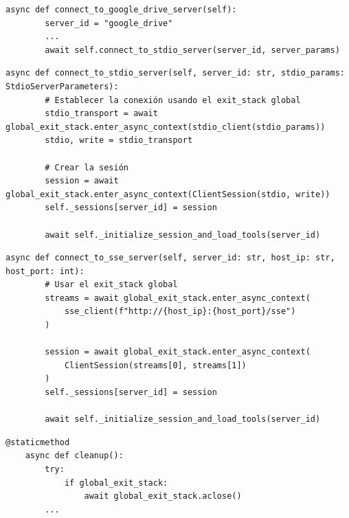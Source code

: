\begin{lstlisting}[caption={mcp\_multi\_client.py: función \textit{connect\_to\_google\_drive\_server en Cliente MCP}},label={lst:mcpconnect}]
    async def connect_to_google_drive_server(self):
        server_id = "google_drive"
        ...
        await self.connect_to_stdio_server(server_id, server_params)
\end{lstlisting}

\begin{lstlisting}[caption={mcp\_multi\_client.py: función \textit{connect\_to\_stdio\_server en cliente MCP}},label={lst:mcpstdio}]
    async def connect_to_stdio_server(self, server_id: str, stdio_params: StdioServerParameters):
        # Establecer la conexión usando el exit_stack global
        stdio_transport = await global_exit_stack.enter_async_context(stdio_client(stdio_params))
        stdio, write = stdio_transport

        # Crear la sesión
        session = await global_exit_stack.enter_async_context(ClientSession(stdio, write))
        self._sessions[server_id] = session

        await self._initialize_session_and_load_tools(server_id)

\end{lstlisting}

\begin{lstlisting}[caption={mcp\_multi\_client.py: función \textit{connect\_to\_sse\_server en cliente MCP}},label={lst:mcpsse}]
    async def connect_to_sse_server(self, server_id: str, host_ip: str, host_port: int):
        # Usar el exit_stack global
        streams = await global_exit_stack.enter_async_context(
            sse_client(f"http://{host_ip}:{host_port}/sse")
        )

        session = await global_exit_stack.enter_async_context(
            ClientSession(streams[0], streams[1])
        )
        self._sessions[server_id] = session

        await self._initialize_session_and_load_tools(server_id)
\end{lstlisting}

\begin{lstlisting}[caption={mcp\_multi\_client.py: función \textit{cleanup()} en cliente MCP},label={lst:clean}]
    @staticmethod
    async def cleanup():
        try:
            if global_exit_stack:
                await global_exit_stack.aclose()
        ...

\end{lstlisting}


